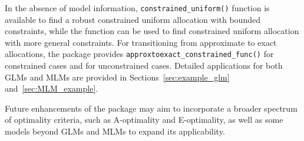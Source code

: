 In the absence of model information, \texttt{constrained\_uniform()} function is available to find a robust constrained uniform allocation with bounded constraints, while the \texttt{} function can be used to find constrained uniform allocation with more general constraints. For transitioning from approximate to exact allocations, the package provides \texttt{approxtoexact\_constrained\_func()} for constrained cases and \texttt{} for unconstrained cases. Detailed applications for both GLMs and MLMs are provided in Sections~\ref{sec:example_glm} and~\ref{sec:MLM_example}.

Future enhancements of the package may aim to incorporate a broader spectrum of optimality criteria, such as A-optimality and E-optimality, as well as some models beyond GLMs and MLMs to expand its applicability.



\address{Yifei Huang\\
  Department of Mathematics, Statistics, and Computer Science\\
  University of Illinois at Chicago\\
E-mail: }

\address{Liping Tong\\
  Advocate Aurora Health\\
E-mail: }

\address{Jie Yang\\
  Department of Mathematics, Statistics, and Computer Science\\
  University of Illinois at Chicago\\
E-mail: }
